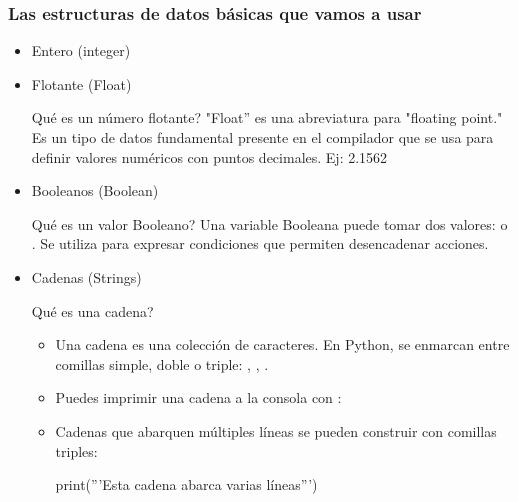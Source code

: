 \documentclass[handout,9pt]{beamer}
\begin{document}
\begin{frame}[fragile]
  \frametitle{Las estructuras de datos básicas que vamos a usar}
  \begin{itemize}
    \item Entero (integer) 
    \item<2-> Flotante (Float) \\\pause
      {\scriptsize
        \begin{minipage}{0.9\textwidth}
          \begin{block}{Qué es un número flotante?}
            "Float'' es una abreviatura para  "floating point." Es un tipo de datos fundamental presente en el compilador que se usa para definir valores numéricos con puntos decimales. Ej: 2.1562
          \end{block}
        \end{minipage}}
    \item<3-> Booleanos (Boolean)  \\ \pause
      {\scriptsize
        \begin{minipage}{0.9\textwidth}
          \begin{block}{Qué es un valor Booleano?}
            Una variable Booleana puede tomar dos valores:
             o . Se utiliza para expresar condiciones que permiten desencadenar acciones.
          \end{block}
        \end{minipage}}
    \item<4-> Cadenas (Strings) 
      {\scriptsize
        \begin{minipage}{0.9\textwidth}
          \begin{block}{Qué es una cadena?}
            \begin{itemize}\scriptsize
            \item Una cadena es una colección de caracteres. En Python, se enmarcan entre comillas simple, doble o triple: , ,
              .\\
            \item Puedes imprimir una cadena a la consola con : 
              \\
            \item Cadenas que abarquen múltiples líneas se pueden construir con comillas triples:
              \begin{pyblock}
print('''Esta cadena abarca 
                     varias líneas''')
              \end{pyblock}
            \end{itemize}
          \end{block}
        \end{minipage}}
  \end{itemize}
\end{frame}
\end{document}
